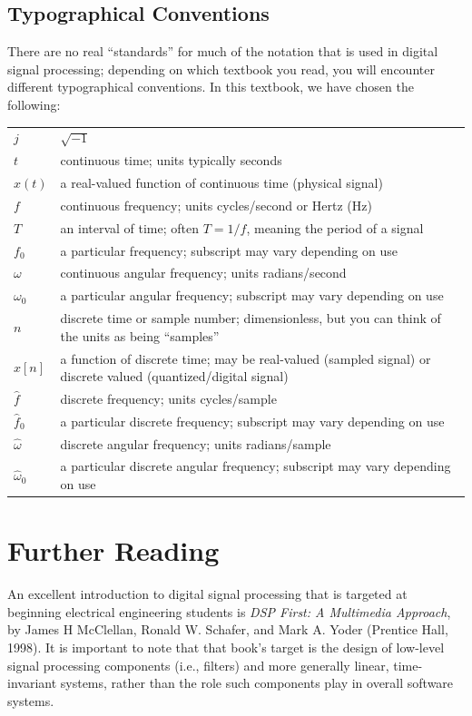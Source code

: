 \subsection*{Typographical Conventions}

There are no real ``standards'' for much of the notation that is used
in digital signal processing; depending on which textbook you read,
you will encounter different typographical conventions. In this
textbook, we have chosen the following:
\begin{center}
\begin{tabular}{lp{5in}}
  $j$    & $\sqrt{-1}$ \\
  $t$    & continuous time; units typically seconds \\
  $x(t)$ & a real-valued function of continuous time (physical signal) \\
  $f$    & continuous frequency; units cycles/second or Hertz (Hz) \\
  $T$    & an interval of time; often $T=1/f$, meaning the period of a
           signal \\
  $f_0$  & a particular frequency; subscript may vary depending on use \\
  $\omega$ & continuous angular frequency; units radians/second \\
  $\omega_0$ & a particular angular frequency; subscript may vary
               depending on use \\
  $n$    & discrete time or sample number; dimensionless, but you can
           think of the units as being ``samples'' \\
  $x[n]$ & a function of discrete time; may be real-valued (sampled
           signal) or discrete valued (quantized/digital signal) \\
  $\hat{f}$ & discrete frequency; units cycles/sample \\
  $\hat{f}_0$  & a particular discrete frequency; subscript may vary
                 depending on use \\
  $\hat{\omega}$ & discrete angular frequency; units radians/sample \\
  $\hat{\omega}_0$ & a particular discrete angular frequency; subscript may vary
               depending on use \\
\end{tabular}
\end{center}

\section*{Further Reading}

An excellent introduction to digital signal processing that is
targeted at beginning electrical engineering students is \textit{DSP
  First: A Multimedia Approach}, by James H McClellan, Ronald
W. Schafer, and Mark A. Yoder (Prentice Hall, 1998).  It is important
to note that that book's target is the design of low-level signal
processing components (i.e., filters) and more generally linear,
time-invariant systems, rather than the role such components play in
overall software systems.

